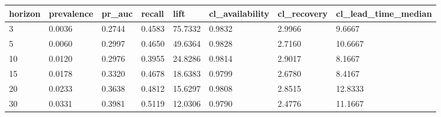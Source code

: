 \begin{tabular}{llllllll}
\toprule
horizon & prevalence & pr\_auc & recall & lift & cl\_availability & cl\_recovery & cl\_lead\_time\_median \\
\midrule
3 & 0.0036 & 0.2744 & 0.4583 & 75.7332 & 0.9832 & 2.9966 & 9.6667 \\
5 & 0.0060 & 0.2997 & 0.4650 & 49.6364 & 0.9828 & 2.7160 & 10.6667 \\
10 & 0.0120 & 0.2976 & 0.3955 & 24.8286 & 0.9814 & 2.9017 & 8.1667 \\
15 & 0.0178 & 0.3320 & 0.4678 & 18.6383 & 0.9799 & 2.6780 & 8.4167 \\
20 & 0.0233 & 0.3638 & 0.4812 & 15.6297 & 0.9808 & 2.8515 & 12.8333 \\
30 & 0.0331 & 0.3981 & 0.5119 & 12.0306 & 0.9790 & 2.4776 & 11.1667 \\
\bottomrule
\end{tabular}

